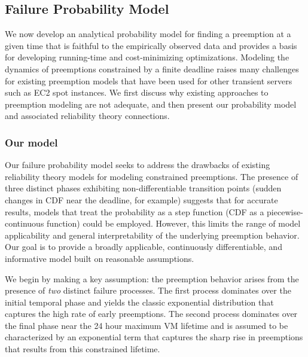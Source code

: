 \documentclass[compsoc]{IEEEtran}
\newcommand{\subsecspace}[0]{-0.20cm}
\begin{document}
\vspace*{\subsecspace}
\subsection{Failure Probability Model}
\label{subsec:analytical-model}

We now develop an analytical probability model for finding a preemption at a given time that is faithful to the empirically observed data and provides a basis for developing running-time and cost-minimizing optimizations. 
Modeling the dynamics of preemptions constrained by a finite deadline raises many challenges for existing preemption models that have been used for other transient servers such as EC2 spot instances.
We first discuss why existing approaches to preemption modeling are not adequate, and then present our probability model and associated reliability theory connections. 





\vspace*{\subsecspace}
\subsubsection{Our  model}
\label{subsec:preemption-model}



Our failure probability model seeks to address the drawbacks of existing reliability theory models for modeling constrained preemptions. 
The presence of three distinct phases exhibiting non-differentiable transition points (sudden changes in CDF near the deadline, for example) suggests that for accurate results, models that treat the probability as a step function (CDF as a piecewise-continuous function) could be employed.
However, this limits the range of model applicability and general interpretability of the underlying preemption behavior. Our goal is to provide a broadly applicable, continuously differentiable, and informative model built on reasonable assumptions.  


We begin by making a key assumption: the preemption behavior arises from the presence of \emph{two} distinct failure processes.
The first process dominates over the initial temporal phase and yields the classic exponential distribution that captures the high rate of early preemptions.
The second process dominates over the final phase near the 24 hour maximum VM lifetime and is assumed to be characterized by an exponential term that captures the sharp rise in preemptions that results from this constrained lifetime. 
\end{document}
